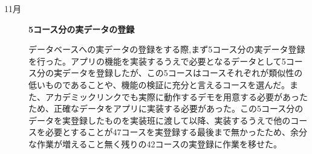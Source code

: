 ﻿\begin{description}
 \item[11月] \textbf{5コース分の実データの登録}\par
データベースへの実データの登録をする際,まず5コース分の実データ登録を行った。アプリの機能を実装するうえで必要となるデータとして5コース分の実データを登録したが、この5コースはコースそれぞれが類似性の低いものであることや、機能の検証に充分と言えるコースを選んだ。また、アカデミックリンクでも実際に動作するデモを用意する必要があったため、正確なデータをアプリに実装する必要があった。この5コース分のデータを実登録したものを実装班に渡して以降、実装するうえで他のコースを必要とすることが47コースを実登録する最後まで無かったため、余分な作業が増えること無く残りの42コースの実登録に作業を移せた。
 \par

\end{description}
